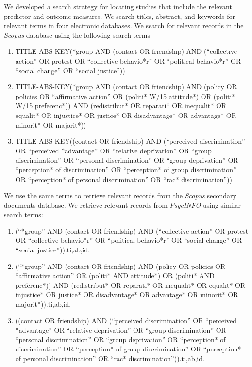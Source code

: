 \documentclass[10pt, a4paper]{article}
\begin{document}
We developed a search strategy for locating studies that include the relevant predictor and outcome measures. We search titles, abstract, and keywords for relevant terms in four electronic databases. We search for relevant records in the \emph{Scopus} database using the following search terms:
\small
\begin{enumerate}
\item TITLE-ABS-KEY(*group AND (contact OR friendship) AND (``collective action'' OR protest OR ``collective behavio*r'' OR ``political behavio*r'' OR ``social change'' OR ``social justice''))
\item TITLE-ABS-KEY(*group AND (contact OR friendship) AND (policy OR policies OR ``affirmative action'' OR (politi* W/15 attitude*) OR (politi* W/15 preferenc*)) AND (redistribut* OR reparati* OR inequalit* OR equalit* OR injustice* OR justice* OR disadvantage* OR advantage* OR minorit* OR majorit*))
\item TITLE-ABS-KEY((contact OR friendship) AND (``perceived discrimination'' OR ``perceived *advantage'' OR ``relative deprivation'' OR ``group discrimination'' OR ``personal discrimination'' OR ``group deprivation'' OR ``perception* of discrimination'' OR ``perception* of group discrimination'' OR ``perception* of personal discrimination'' OR ``rac* discrimination''))
\end{enumerate}
\normalsize
We use the same terms to retrieve relevant records from the \emph{Scopus} secondary documents database. We retrieve relevant records from \emph{PsycINFO} using similar search terms:
\small
\begin{enumerate}
\item (``*group'' AND (contact OR friendship) AND (``collective action'' OR protest OR ``collective behavio*r'' OR ``political behavio*r'' OR ``social change'' OR ``social justice'')).ti,ab,id.
\item (``*group'' AND (contact OR friendship) AND (policy OR policies OR ``affirmative action'' OR (politi* AND attitude*) OR (politi* AND preferenc*)) AND (redistribut* OR reparati* OR inequalit* OR equalit* OR injustice* OR justice* OR disadvantage* OR advantage* OR minorit* OR majorit*)).ti,ab,id.
\item ((contact OR friendship) AND (``perceived discrimination'' OR ``perceived *advantage'' OR ``relative deprivation'' OR ``group discrimination'' OR ``personal discrimination'' OR ``group deprivation'' OR ``perception* of discrimination'' OR ``perception* of group discrimination'' OR ``perception* of personal discrimination'' OR ``rac* discrimination'')).ti,ab,id.
\end{enumerate}
\end{document}
